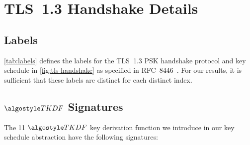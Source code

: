 \section{TLS~1.3 Handshake Details}
\label{app:tls-handshake}

\subsection{Labels}
\label{app:label-def}

\autoref{tab:labels} defines the labels for the TLS~1.3 PSK handshake protocol and key schedule in \autoref{fig:tls-handshake} as specified in RFC~8446~\cite{rfc8446}.
For our results, it is sufficient that these labels are distinct for each distinct index.



\subsection{\texorpdfstring{$\TLSKDF$}{TLSKDF} Signatures}
\label{app:TLSKDF-signatures}

The 11 $\TLSKDF$ key derivation function we introduce in our key schedule abstraction have the following signatures:


